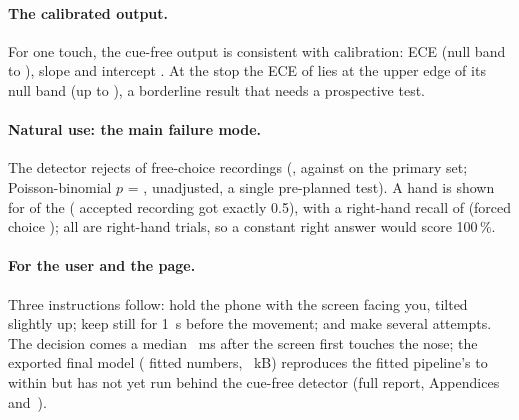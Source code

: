 \paragraph{The calibrated output.} For one touch, the cue-free output is consistent with calibration: ECE
 (null band  to ), slope
 and intercept . At the stop the ECE of
 lies at the upper edge of its null band (up to
), a borderline result that needs a prospective test.

\paragraph{Natural use: the main failure mode.} The detector rejects  of 
free-choice recordings (, against  on the primary set;
Poisson-binomial $p$ = , unadjusted, a single pre-planned test). A hand is shown for
 of the  ( accepted recording got exactly
0.5), with a right-hand recall of 
(forced choice ); all are right-hand trials, so a constant right answer would score
100\,\%.

\paragraph{For the user and the page.} Three instructions follow: hold the phone with the screen facing you, tilted
slightly up; keep still for 1~s before the movement; and make several attempts. The decision comes a median
~ms after the screen first touches the nose; the exported final model (
fitted numbers, ~kB) reproduces the fitted pipeline's \pright{} to within 
but has not yet run behind the cue-free detector (full report, Appendices~
and~).
